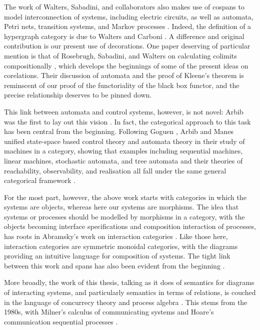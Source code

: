 The work of Walters, Sabadini, and collaborators also makes use of cospans to
model interconnection of systems, including electric circuits, as well as
automata, Petri nets, transition systems, and Markov processes \cite{KSW,KSW2,
RSW05,RSW08,ASW}. Indeed, the definition of a hypergraph category is due to
Walters and Carboni \cite{Car91}. A difference and original contribution is our
present use of decorations. One paper deserving of particular mention is that of
Rosebrugh, Sabadini, and Walters on calculating colimits compositionally
\cite{RSW08}, which develops the beginnings of some of the present ideas on
corelations. Their discussion of automata and the proof of Kleene's theorem is
reminscent of our proof of the functoriality of the black box functor, and the
precise relationship deserves to be pinned down.

This link between automata and control systems, however, is not novel: Arbib
was the first to lay out this vision \cite{Arb65}. In fact, the categorical
approach to this task has been central from the beginning. Following Goguen
\cite{Gog72}, Arbib and Manes unified state-space based control theory and
automata theory in their study of machines in a category, showing that examples
including sequential machines, linear machines, stochastic automata, and tree
automata and their theories of reachability, observability, and realisation all
fall under the same general categorical framework \cite{AM74a,AM74b,AM80}.

For the most part, however, the above work starts with categories in which the
systems are objects, whereas here our systems are morphisms. The idea that
systems or processes should be modelled by morphisms in a category, with the
objects becoming interface specifications and composition interaction of
processes, has roots in Abramsky's work on interaction categories
\cite{Abr93,Abr94,AGN95}.  Like those here, interaction categories are symmetric
monoidal categories, with the diagrams providing an intuitive language for
composition of systems. The tight link between this work and spans has also been
evident from the beginning \cite{CS94}.

More broadly, the work of this thesis, talking as it does of semantics for
diagrams of interacting systems, and particularly semantics in terms of
relations, is couched in the language of concurrecy theory and process algebra
\cite{Bae05}. This stems from the 1980s, with Milner's calculus of communicating
systems \cite{Mil80} and Hoare's communication sequential processes
\cite{Hoa78}.



